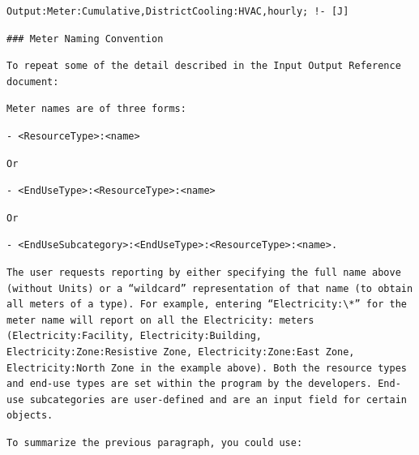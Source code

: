 \begin{lstlisting}
Output:Meter:Cumulative,DistrictCooling:HVAC,hourly; !- [J]
\end{lstlisting}

\begin{lstlisting}
### Meter Naming Convention
\end{lstlisting}

\begin{lstlisting}
To repeat some of the detail described in the Input Output Reference document:
\end{lstlisting}

\begin{lstlisting}
Meter names are of three forms:
\end{lstlisting}

\begin{lstlisting}
- <ResourceType>:<name>
\end{lstlisting}

\begin{lstlisting}
Or
\end{lstlisting}

\begin{lstlisting}
- <EndUseType>:<ResourceType>:<name>
\end{lstlisting}

\begin{lstlisting}
Or
\end{lstlisting}

\begin{lstlisting}
- <EndUseSubcategory>:<EndUseType>:<ResourceType>:<name>.
\end{lstlisting}

\begin{lstlisting}
The user requests reporting by either specifying the full name above (without Units) or a “wildcard” representation of that name (to obtain all meters of a type). For example, entering “Electricity:\*” for the meter name will report on all the Electricity: meters (Electricity:Facility, Electricity:Building, Electricity:Zone:Resistive Zone, Electricity:Zone:East Zone, Electricity:North Zone in the example above). Both the resource types and end-use types are set within the program by the developers. End-use subcategories are user-defined and are an input field for certain objects.
\end{lstlisting}

\begin{lstlisting}
To summarize the previous paragraph, you could use:
\end{lstlisting}

